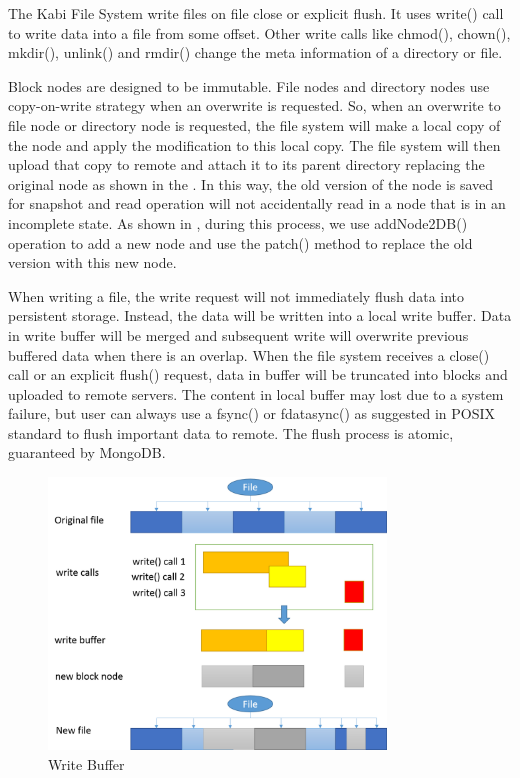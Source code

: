     The Kabi File System write files on file close or explicit flush. It uses write() call to write data into a file from some offset. Other write calls like chmod(), chown(), mkdir(), unlink() and rmdir() change the meta information of a directory or file.

    Block nodes are designed to be immutable. File nodes and directory nodes use copy-on-write strategy when an overwrite is requested. So, when an overwrite to file node or directory node is requested, the file system will make a local copy of the node and apply the modification to this local copy. The file system will then upload that copy to remote and attach it to its parent directory replacing the original node as shown in the . In this way, the old version of the node is saved for snapshot and read operation will not accidentally read in a node that is in an incomplete state. As shown in , during this process, we use addNode2DB() operation to add a new node and use the patch() method to replace the old version with this new node.

	When writing a file, the write request will not immediately flush data into persistent storage. Instead, the data will be written into a local write buffer. Data in write buffer will be merged and subsequent write will overwrite previous buffered data when there is an overlap. When the file system receives a close() call or an explicit flush() request, data in buffer will be truncated into blocks and uploaded to remote servers. The content in local buffer may lost due to a system failure, but user can always use a fsync() or fdatasync() as suggested in POSIX standard to flush important data to remote. The flush process is atomic, guaranteed by MongoDB. 

\begin{figure}[hbtp]
\centering
\includegraphics[width=0.8\textwidth]{Chapter-3/figs/fig11.png}
\caption{Write Buffer}
\label{fig:buffer}
\end{figure}

